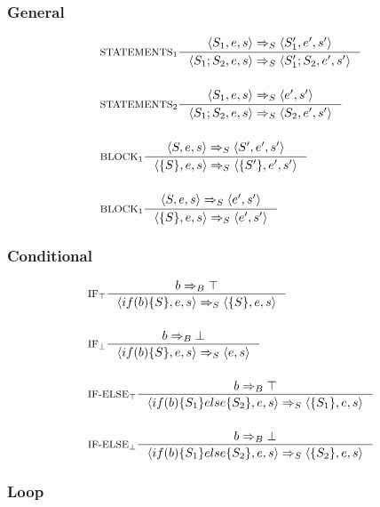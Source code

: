 \subsubsection{General}
\begin{align*}
&\inference[$\text{STATEMENTS}_1$]{\Braket{S_1,e,s} \Rightarrow_S \Braket{S_1',e',s'}}
                         {\Braket{S_1;S_2,e,s} \Rightarrow_S \Braket{S_1';S_2,e',s'}}
\\\\
&\inference[$\text{STATEMENTS}_2$]{\Braket{S_1,e,s} \Rightarrow_S \Braket{e',s'}}
                         {\Braket{S_1;S_2,e,s} \Rightarrow_S \Braket{S_2,e',s'}}
\\\\
&\inference[$\text{BLOCK}_1$]{\Braket{S,e,s} \Rightarrow_S \Braket{S',e',s'}}
                         {\Braket{\{S\},e,s} \Rightarrow_S \Braket{\{S'\},e',s'}}
\\\\
&\inference[$\text{BLOCK}_1$]{\Braket{S,e,s} \Rightarrow_S \Braket{e',s'}}
                         {\Braket{\{S\},e,s} \Rightarrow_S \Braket{e',s'}}
\end{align*}

\subsubsection{Conditional}
\newcommand{\Tif}{\text{if}}
\newcommand{\Telse}{\text{else}}

\begin{align*}
&\inference[$\text{IF}_\top$]{b \Rightarrow_B \top}
                      {\Braket{if(b)\{S\},e,s} \Rightarrow_S \Braket{\{S\},e,s}}
\\\\
&\inference[$\text{IF}_\bot$]{b \Rightarrow_B \bot}
                      {\Braket{if(b)\{S\},e,s} \Rightarrow_S \Braket{e,s}}
\\\\
&\inference[$\text{IF-ELSE}_\top$]{b \Rightarrow_B \top}
                      {\Braket{if(b)\{S_1\}else\{S_2\},e,s} \Rightarrow_S \Braket{\{S_1\},e,s}}
\\\\
&\inference[$\text{IF-ELSE}_\bot$]{b \Rightarrow_B \bot}
                      {\Braket{if(b)\{S_1\}else\{S_2\},e,s} \Rightarrow_S \Braket{\{S_2\},e,s}}
\end{align*}
\subsubsection{Loop}
\newcommand{\Tfor}{\mathbin{\text{for}}}
\newcommand{\Tx}{\mathbin{\text{x}}}
\newcommand{\Tin}{\mathbin{\text{in}}}
\newcommand{\Twhile}{\mathbin{\text{while}}}

